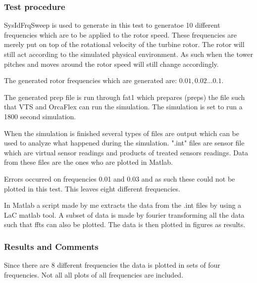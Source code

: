 \subsubsection{Test procedure}
SysIdFrqSweep is used to generate in this test to generatoe 10 different frequencies which are to be applied to the rotor speed. These frequencies are merely put on top of the rotational velocity of the turbine rotor. The rotor will still act according to the simulated physical environment. As such when the tower pitches and moves around the rotor speed will still change accordingly.

The generated rotor frequencies which are generated  are: $0.01, 0.02 ... 0.1$.

The generated prep file is run through fat1 which prepares (preps) the file such that VTS and OrcaFlex can run the simulation. The simulation is set to run a 1800 second simulation.

When the simulation is finished several types of files are output which can be used to analyze what happened during the simulation. ".int" files are sensor file which are virtual sensor readings and products of treated sensors readings. Data from these files are the ones who are plotted in Matlab.

Errors occurred on frequencies 0.01 and 0.03 and as such these could not be plotted in this test. This leaves eight different frequencies.

In Matlab a script made by me extracts the data from the .int files by using a LaC matlab tool. A subset of data is made by fourier transforming all the data such that ffts can also be plotted. The data is then plotted in figures as results.


\subsubsection{Results and Comments}
Since there are 8 different frequencies the data is plotted in sets of four frequencies. Not all all plots of all frequencies are included. 

